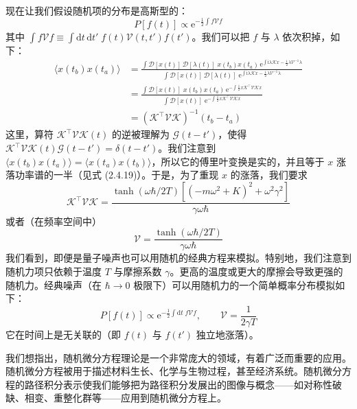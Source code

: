 现在让我们假设随机项的分布是高斯型的：
\begin{equation*}
P[f(t)] \propto \mathrm{e}^{-\frac{1}{2}\int f\mathcal{V}f}
\end{equation*}
其中 $\int f\mathcal{V}f \equiv \int \mathrm{d}t\,\mathrm{d}t'\;f(t)\mathcal{V}(t,t')f(t')$。我们可以把 $f$ 与 $\lambda$ 依次积掉，如下：
\begin{align*}
\langle x(t_b)x(t_a)\rangle &= \frac{\int \mathcal{D}[x(t)]\,\mathcal{D}[\lambda(t)]\;x(t_b)x(t_a)\,\mathrm{e}^{\int \mathrm{i}\lambda\mathcal{K}x - \frac{1}{2}\lambda\mathcal{V}^{-1}\lambda}}{\int \mathcal{D}[x(t)]\,\mathcal{D}[\lambda(t)]\;\mathrm{e}^{\int \mathrm{i}\lambda\mathcal{K}x - \frac{1}{2}\lambda\mathcal{V}^{-1}\lambda}}\\
&= \frac{\int \mathcal{D}[x(t)]\;x(t_b)x(t_a)\,\mathrm{e}^{-\int \frac{1}{2}x\mathcal{K}^{\top}\mathcal{V}\mathcal{K}x}}{\int \mathcal{D}[x(t)]\;\mathrm{e}^{-\int \frac{1}{2}x\mathcal{K}^{\top}\mathcal{V}\mathcal{K}x}}\\
&= (\mathcal{K}^{\top}\mathcal{V}\mathcal{K})^{-1}(t_b - t_a)
\end{align*}
这里，算符 $\mathcal{K}^{\top}\mathcal{V}\mathcal{K}(t)$ 的逆被理解为 $\mathcal{G}(t - t')$，使得 $\mathcal{K}^{\top}\mathcal{V}\mathcal{K}(t)\mathcal{G}(t - t') = \delta(t - t')$。我们注意到 $\langle x(t_b)x(t_a)\rangle = \langle x(t_a)x(t_b)\rangle$，所以它的傅里叶变换是实的，并且等于 $x$ 涨落功率谱的一半（见式 (2.4.19)）。于是，为了重现 $x$ 的涨落，我们要求
\begin{equation*}
\mathcal{K}^{\top}\mathcal{V}\mathcal{K} = \frac{\tanh(\omega\hbar/2T)\left[(-m\omega^2 + K)^2 + \omega^2\gamma^2\right]}{\gamma\omega\hbar}
\end{equation*}
或者（在频率空间中）
\begin{equation*}
\mathcal{V} = \frac{\tanh(\omega\hbar/2T)}{\gamma\omega\hbar}
\end{equation*}
我们看到，即便是量子噪声也可以用随机的经典方程来模拟。特别地，我们注意到随机力项只依赖于温度 $T$ 与摩擦系数 $\gamma$。更高的温度或更大的摩擦会导致更强的随机力。经典噪声（在 $\hbar \to 0$ 极限下）可以用随机力的一个简单概率分布模拟如下：
\begin{equation*}
P[f(t)] \propto \mathrm{e}^{-\frac{1}{2}\int \mathrm{d}t\;f\mathcal{V}f}, \qquad \mathcal{V} = \frac{1}{2\gamma T}
\end{equation*}
它在时间上是无关联的（即 $f(t)$ 与 $f(t')$ 独立地涨落）。

我们想指出，随机微分方程理论是一个非常庞大的领域，有着广泛而重要的应用。随机微分方程被用于描述材料生长、化学与生物过程，甚至经济系统。随机微分方程的路径积分表示使我们能够把为路径积分发展出的图像与概念——如对称性破缺、相变、重整化群等——应用到随机微分方程上。

